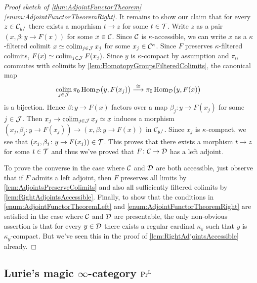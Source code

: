 \begin{proof}[Proof sketch of \cref{thm:AdjointFunctorTheorem}\cref{enum:AdjointFunctorTheoremRight}]
	It remains to show our claim that for every $z\in\mathcal{C}_{y/}$ there exists a moprhism $t\rightarrow z$ for some $t\in\mathcal{T}$. Write $z$ as a pair $(x,\beta\colon y\rightarrow F(x))$ for some $x\in \mathcal{C}$. Since $\mathcal{C}$ is $\kappa$-accessible, we can write $x$ as a $\kappa$-filtered colimit $x\simeq \operatorname*{colim}_{j\in\mathcal{J}}x_j$ for some $x_j\in \mathcal{C}^\kappa$. Since $F$ preserves $\kappa$-filtered colimits, $F(x)\simeq \operatorname*{colim}_{j\in\mathcal{J}}F(x_j)$. Since $y$ is $\kappa$-compact by assumption and $\pi_0$ commutes with colimits by \cref{lem:HomotopyGroupsFilteredColimits}, the canonical map
	\begin{equation*}
		\operatorname*{colim}_{j\in\mathcal{J}}\pi_0\operatorname{Hom}_{\mathcal{D}}\bigl(y,F(x_j)\bigr)\overset{\cong}{\longrightarrow}\pi_0\operatorname{Hom}_{\mathcal{D}}\bigl(y,F(x)\bigr)
	\end{equation*}
	is a bijection. Hence $\beta\colon y\rightarrow F(x)$ factors over a map $\beta_j\colon y\rightarrow F(x_j)$ for some $j\in\mathcal{J}$. Then $x_j\rightarrow\operatorname*{colim}_{j\in\mathcal{J}}x_j\simeq x$ induces a morphism $(x_j,\beta_j\colon y\rightarrow F( x_j))\rightarrow (x,\beta\colon y\rightarrow F(x))$ in $\mathcal{C}_{y/}$. Since $x_j$ is $\kappa$-compact, we see that $(x_j,\beta_j\colon y\rightarrow F( x_j))\in\mathcal{T}$. This proves that there exists a morphism $t\rightarrow z$ for some $t\in\mathcal{T}$ and thus we've proved that $F\colon \mathcal{C}\rightarrow \mathcal{D}$ has a left adjoint.
	
	To prove the converse in the case where $\mathcal{C}$ and $\mathcal{D}$ are both accessible, just observe that if $F$ admits a left adjoint, then $F$ preserves all limits by \cref{lem:AdjointsPreserveColimits} and also all sufficiently filtered colimits by \cref{lem:RightAdjointsAccessible}. Finally, to show that the conditions in \cref{enum:AdjointFunctorTheoremLeft} and \cref{enum:AdjointFunctorTheoremRight} are satisfied in the case where $\mathcal{C}$ and $\mathcal{D}$ are presentable, the only non-obvious assertion is that for every $y\in\mathcal{D}$ there exists a regular cardinal $\kappa_y$ such that $y$ is $\kappa_y$-compact. But we've seen this in the proof of \cref{lem:RightAdjointsAccessible} already.
\end{proof}

\subsection{Lurie's magic \texorpdfstring{$\infty$}{Infinity}-category \texorpdfstring{$\mathrm{Pr}^{\mathrm{L}}$}{PrL}}\label{subsec:PrL}

